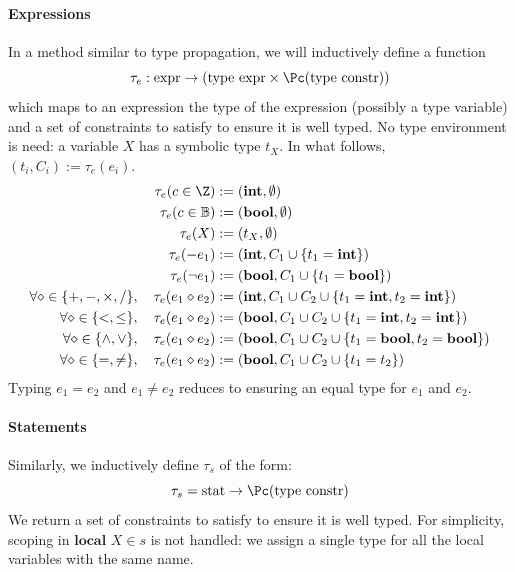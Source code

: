 \documentclass[toc, titlepaged]{../cs-classes/cs-classes}
\begin{document}
\paragraph*{Expressions}
In a method similar to type propagation, we will inductively define a function
\begin{equation*}
    \tau_e : \textnormal{expr} \to (\textnormal{type expr} \times \Pc(\textnormal{type constr}))
\end{equation*}
which maps to an expression the type of the expression (possibly a type variable) and a set of constraints to satisfy to ensure it is well typed. No type environment is need: a variable $X$ has a symbolic type $t_X$. In what follows, $(t_i, C_i) := \tau_e(e_i)$.
\begin{equation*}
    \begin{aligned}
        \tau_e(c\in\Z) &:= (\textbf{int}, \emptyset)\\
        \tau_e(c\in\B) &:= (\textbf{bool}, \emptyset)\\
        \tau_e(X) &:= (t_X, \emptyset)\\
        \tau_e(-e_1) &:= (\textbf{int}, C_1\cup\{t_1=\textbf{int}\})\\
        \tau_e(\lnot e_1) &:= (\textbf{bool}, C_1\cup\{t_1=\textbf{bool}\})\\
        \forall \diamond\in\{+, -, \times, /\}, \quad \tau_e(e_1\diamond e_2) &:= (\textbf{int}, C_1\cup C_2\cup\{t_1=\textbf{int}, t_2=\textbf{int}\})\\
        \forall \diamond\in\{<, \leq\}, \quad \tau_e(e_1\diamond e_2) &:= (\textbf{bool}, C_1\cup C_2\cup\{t_1=\textbf{int}, t_2=\textbf{int}\})\\
        \forall \diamond\in\{\land, \lor\}, \quad \tau_e(e_1\diamond e_2) &:= (\textbf{bool}, C_1\cup C_2\cup\{t_1=\textbf{bool}, t_2=\textbf{bool}\})\\
        \forall \diamond\in\{=, \neq\}, \quad \tau_e(e_1\diamond e_2) &:= (\textbf{bool}, C_1\cup C_2\cup\{t_1=t_2\})
    \end{aligned}
\end{equation*}
\noindent Typing $e_1=e_2$ and $e_1\neq e_2$ reduces to ensuring an equal type for $e_1$ and $e_2$.

\paragraph*{Statements}
Similarly, we inductively define $\tau_s$ of the form:
\begin{equation*}
    \tau_s=\textnormal{stat}\to\Pc(\textnormal{type constr})
\end{equation*}
We return a set of constraints to satisfy to ensure it is well typed. For simplicity, scoping in $\textbf{local } X\in s$ is not handled: we assign a single type for all the local variables with the same name. 
\end{document}
